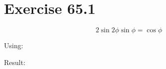 \documentclass[a4paper, 10pt]{scrartcl}
\begin{document}
\section{Exercise 65.1}

\[2\sin{2\phi}\sin{\phi} = \cos{\phi}\]

Using:

Result:
\end{document}
